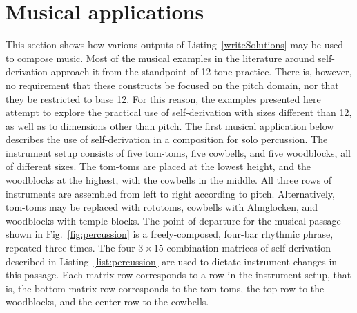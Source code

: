 


\section{Musical applications}

This section shows how various outputs of Listing~\ref{writeSolutions} may be used to compose music. Most of the musical examples in the literature around self-derivation approach it from the standpoint of 12-tone practice. There is, however, no requirement that these constructs be focused on the pitch domain, nor that they be restricted to base 12. For this reason, the examples presented here attempt to explore the practical use of self-derivation with sizes different than 12, as well as to dimensions other than pitch. The first musical application below describes the use of self-derivation in a composition for solo percussion. The instrument setup consists of five tom-toms, five cowbells, and five woodblocks, all of different sizes. The tom-toms are placed at the lowest height, and the woodblocks at the highest, with the cowbells in the middle. All three rows of instruments are assembled from left to right according to pitch. Alternatively, tom-toms may be replaced with rototoms, cowbells with Almglocken, and woodblocks with temple blocks. The point of departure for the musical passage shown in Fig.~\ref{fig:percussion} is a freely-composed, four-bar rhythmic phrase, repeated three times. The four $3 \times 15$ combination matrices of self-derivation described in Listing~\ref{list:percussion} are used to dictate instrument changes in this passage. Each matrix row corresponds to a row in the instrument setup, that is, the bottom matrix row corresponds to the tom-toms, the top row to the woodblocks, and the center row to the cowbells.

